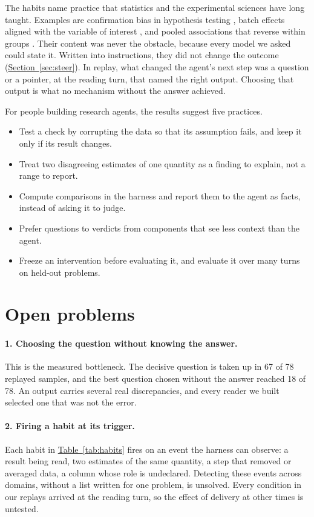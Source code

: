 \documentclass[10pt]{article}
\newcommand{\tabref}[1]{\hyperref[#1]{Table~\ref*{#1}}}
\newcommand{\sref}[1]{\hyperref[#1]{Section~\ref*{#1}}}
\begin{document}
The habits name practice that statistics and the experimental sciences have long taught. Examples are confirmation bias in hypothesis testing
\citep{wason1960}, batch effects aligned with the variable of interest \citep{leek2010}, and pooled associations that reverse within groups
\citep{simpson1951}. Their content was never the obstacle, because every model we asked could state it. Written into instructions, they did not
change the outcome (\sref{sec:steer}). In replay, what changed the agent's next step was a question or a pointer, at the reading turn, that named
the right output. Choosing that output is what no mechanism without the answer achieved.

For people building research agents, the results suggest five practices.
\begin{itemize}
\item Test a check by corrupting the data so that its assumption fails, and keep it only if its result changes.
\item Treat two disagreeing estimates of one quantity as a finding to explain, not a range to report.
\item Compute comparisons in the harness and report them to the agent as facts, instead of asking it to judge.
\item Prefer questions to verdicts from components that see less context than the agent.
\item Freeze an intervention before evaluating it, and evaluate it over many turns on held-out problems.
\end{itemize}

\FloatBarrier
\section{Open problems}\label{sec:open}

\paragraph{1. Choosing the question without knowing the answer.} This is the measured bottleneck. The decisive question is taken up in 67 of
78 replayed samples, and the best question chosen without the answer reached 18 of 78. An output carries several real discrepancies, and every
reader we built selected one that was not the error.

\paragraph{2. Firing a habit at its trigger.} Each habit in \tabref{tab:habits} fires on an event the harness can observe: a result being read,
two estimates of the same quantity, a step that removed or averaged data, a column whose role is undeclared. Detecting these events across domains,
without a list written for one problem, is unsolved. Every condition in our replays arrived at the reading turn, so the effect of delivery at other
times is untested.
\end{document}
